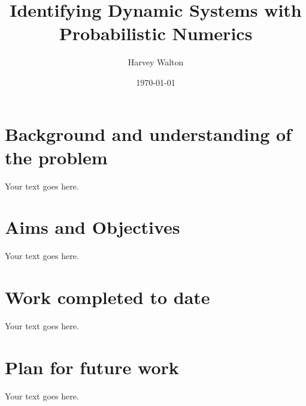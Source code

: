 \documentclass[12pt]{article}
\title{Identifying Dynamic Systems with Probabilistic Numerics}
\author{Harvey Walton}
\date{\today}
\begin{document}
    

    \section{Background and understanding of the problem}
    Your text goes here.

    \section{Aims and Objectives}
    Your text goes here.

    \section{Work completed to date}
    Your text goes here. \cite{q-candela}
    \section{Plan for future work}
    Your text goes here.

    \printbibliography
\end{document}
